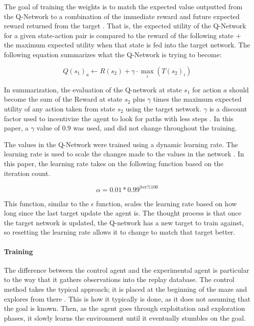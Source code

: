 \documentclass[12pt,letterpaper]{article}
\begin{document}
The goal of training the weights is to match the expected value outputted from the Q-Network to a combination of the immediate reward and future expected reward returned from the target \cite{article_reinforcement_learning_survey}.
That is, the expected utility of the Q-Network for a given state-action pair is compared to the reward of the following state + the maximum expected utility when that state is fed into the target network.
The following equation summarizes what the Q-Network is trying to become:

$$Q(s_{1})_{a} \leftarrow R(s_2) + \gamma \cdot \max_i(T(s_2)_i)$$

In summarization, the evaluation of the Q-network at state  $s_1$ for action $a$ should become the sum of the Reward at state $s_2$ plus $\gamma$ times the maximum expected utility of any action taken from state $s_2$ using the target network.
$\gamma$ is a discount factor used to incentivize the agent to look for paths with less steps \cite{article_reinforcement_learning_for_robots}.
In this paper, a $\gamma$ value of $0.9$ was used, and did not change throughout the training.

The values in the Q-Network were trained using a dynamic learning rate.
The learning rate is used to scale the changes made to the values in the network \cite{article_reinforcement_learning_for_robots}.
In this paper, the learning rate takes on the following function based on the iteration count.

$$\alpha = 0.01 * 0.99^{\text{iter} \% 100}$$

This function, similar to the $\epsilon$ function, scales the learning rate based on how long since the last target update the agent is.
The thought process is that once the target network is updated, the Q-network has a new target to train against, so resetting the learning rate allows it to change to match that target better.

\paragraph{Training} 

The difference between the control agent and the experimental agent is particular to the way that it gathers observations into the replay database.
The control method takes the typical approach; it is placed at the beginning of the maze and explores from there \cite{article_reinforcement_learning_survey}.
This is how it typically is done, as it does not assuming that the goal is known.
Then, as the agent goes through exploitation and exploration phases, it slowly learns the environment until it eventually stumbles on the goal.
\end{document}

